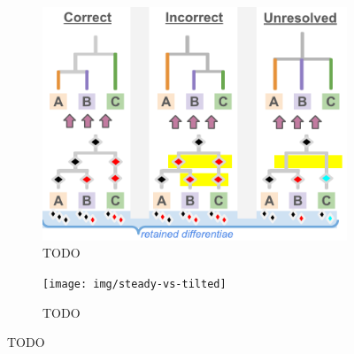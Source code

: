 \begin{figure}
 \centering
 \begin{subfigure}[b]{0.5\textwidth}
  \centering
  \includegraphics[width=\textwidth]{img/hstrat-failure-modes}
  \caption{TODO}
  \label{fig:example-TODO}
 \end{subfigure}%
 \begin{subfigure}[b]{0.5\textwidth}
  \centering
  \texttt{[image: img/steady-vs-tilted]}
  \caption{TODO}
  \label{fig:example-TODO}
 \end{subfigure}
 \caption{TODO}
 \label{fig:example}
\end{figure}
